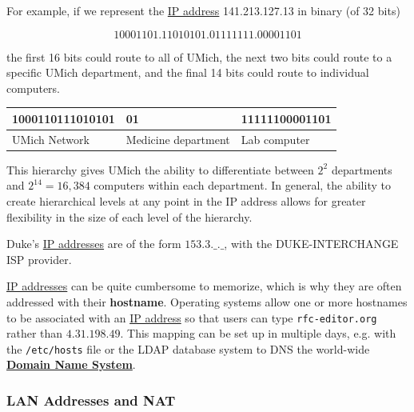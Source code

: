 \documentclass{article}
\newcounter{definition}[section]
\newcounter{example}[section]
\begin{document}
    \begin{example}
      \label{ex:university-of-michigan}
      For example, if we represent the \hyperref[def:ip-address]{IP address} 141.213.127.13 in binary (of 32 bits)

        \begin{equation}
          10001101.11010101.01111111.00001101
        \end{equation}

      the first 16 bits could route to all of UMich, the next two bits could route to a specific UMich department, and the final 14 bits could route to individual computers. 
      \begin{center}
      \begin{tabular}{l|l|l}
          1000110111010101 & 01 & 11111100001101  \\
          \hline
          UMich Network & Medicine department & Lab computer 
      \end{tabular}
      \end{center}
      This hierarchy gives UMich the ability to differentiate between $2^2$ departments and $2^{14} = 16,384$ computers within each department. In general, the ability to create hierarchical levels at any point in the IP address allows for greater flexibility in the size of each level of the hierarchy. 
    \end{example}
    
    \begin{example}[Duke]
      \label{ex:duke}
      Duke's \hyperref[def:ip-addresses]{IP addresses} are of the form $153.3.\_.\_$, with the DUKE-INTERCHANGE ISP provider.  
    \end{example} 

    \begin{definition}[Hostname]
      \label{def:hostname}
      \hyperref[def:ip-addresses]{IP addresses} can be quite cumbersome to memorize, which is why they are often addressed with their \textbf{hostname}. Operating systems allow one or more hostnames to be associated with an \hyperref[def:ip-address]{IP address} so that users can type \texttt{rfc-editor.org} rather than $4.31.198.49$. This mapping can be set up  in multiple days, e.g. with the \texttt{/etc/hosts} file or the LDAP database system to DNS the world-wide \textbf{\hyperref[def:domain-name-system]{Domain Name System}}. 
    \end{definition}

    \subsubsection{LAN Addresses and NAT} 
\end{document}
